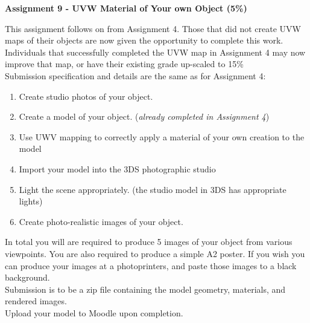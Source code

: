 
	
\begin{flushleft}
\Large\textbf{Assignment 9 - UVW Material of Your own Object (5\%)}\\
\end{flushleft}


This assignment follows on from Assignment 4.  Those that did not create UVW maps of their objects are now given the opportunity to complete this work.  Individuals that successfully completed the UVW map in Assignment 4 may now improve that map, or have their existing grade up-scaled to 15\%\\

Submission specification and details are the same as for Assignment 4:\\

\begin{enumerate}
	\item Create studio photos of your object. 
	\item Create a model of your object. (\textit{already completed in Assignment 4})
	\item Use UWV mapping to correctly apply a material of your own creation to the model
	\item Import your model into the 3DS photographic studio
	\item Light the scene appropriately. (the studio model in 3DS has appropriate lights)
	\item Create photo-realistic images of your object.
\end{enumerate}

In total you will are required to produce 5 images of your object from various viewpoints.  You are also required to produce a simple A2 poster.  If you wish you can produce your images at a photoprinters, and paste those images to a black background.\\

Submission is to be a zip file containing the model geometry, materials, and rendered images.\\

Upload your model to Moodle upon completion.


